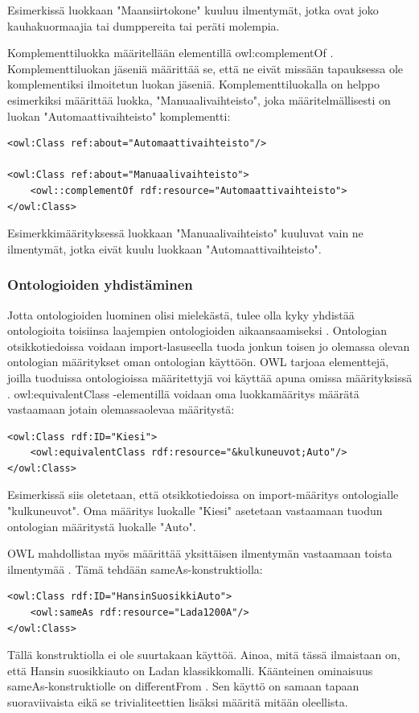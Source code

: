 \documentclass[finnish]{tktltiki2}
\theoremstyle{definition}
\theoremstyle{remark}
\begin{document}
Esimerkissä luokkaan "Maansiirtokone" kuuluu ilmentymät, jotka ovat joko kauhakuormaajia tai dumppereita tai peräti molempia.
 
Komplementtiluokka määritellään elementillä owl:complementOf  \cite{SWM04}. Komplementtiluokan jäseniä määrittää se, että ne eivät missään tapauksessa ole komplementiksi ilmoitetun luokan jäseniä. Komplementtiluokalla on helppo esimerkiksi määrittää luokka, "Manuaalivaihteisto", joka määritelmällisesti on luokan "Automaattivaihteisto" komplementti:
\begin{verbatim}
<owl:Class ref:about="Automaattivaihteisto"/>

<owl:Class ref:about="Manuaalivaihteisto">
    <owl::complementOf rdf:resource="Automaattivaihteisto">
</owl:Class>
\end{verbatim}
Esimerkkimäärityksessä luokkaan "Manuaalivaihteisto" kuuluvat vain ne ilmentymät, jotka eivät kuulu luokkaan "Automaattivaihteisto". 

\subsubsection{Ontologioiden yhdistäminen}
Jotta ontologioiden luominen olisi mielekästä, tulee olla kyky yhdistää ontologioita toisiinsa laajempien ontologioiden aikaansaamiseksi \cite{SWM04}.  Ontologian otsikkotiedoissa voidaan import-lasuseella tuoda jonkun toisen jo olemassa olevan ontologian määritykset oman ontologian käyttöön. OWL tarjoaa elementtejä, joilla tuoduissa ontologioissa määritettyjä voi käyttää apuna omissa määrityksissä \cite{SWM04}.
owl:equivalentClass -elementillä voidaan oma luokkamääritys määrätä vastaamaan jotain olemassaolevaa määritystä: 
\begin{verbatim}
<owl:Class rdf:ID="Kiesi">
    <owl:equivalentClass rdf:resource="&kulkuneuvot;Auto"/>
</owl:Class>
\end{verbatim}
Esimerkissä siis oletetaan, että otsikkotiedoissa on import-määritys ontologialle "kulkuneuvot". Oma määritys luokalle "Kiesi" asetetaan vastaamaan tuodun ontologian määritystä luokalle "Auto". 

OWL mahdollistaa myös määrittää yksittäisen ilmentymän vastaamaan toista ilmentymää \cite{SWM04}. Tämä tehdään sameAs-konstruktiolla: 
\begin{verbatim}
<owl:Class rdf:ID="HansinSuosikkiAuto">
    <owl:sameAs rdf:resource="Lada1200A"/>
</owl:Class>
\end{verbatim}
Tällä konstruktiolla ei ole suurtakaan käyttöä. Ainoa, mitä tässä ilmaistaan on, että Hansin suosikkiauto on Ladan klassikkomalli. Käänteinen ominaisuus sameAs-konstruktiolle on differentFrom \cite{SWM04}. Sen käyttö on samaan tapaan suoraviivaista eikä se trivialiteettien lisäksi määritä mitään oleellista. 
\end{document}
